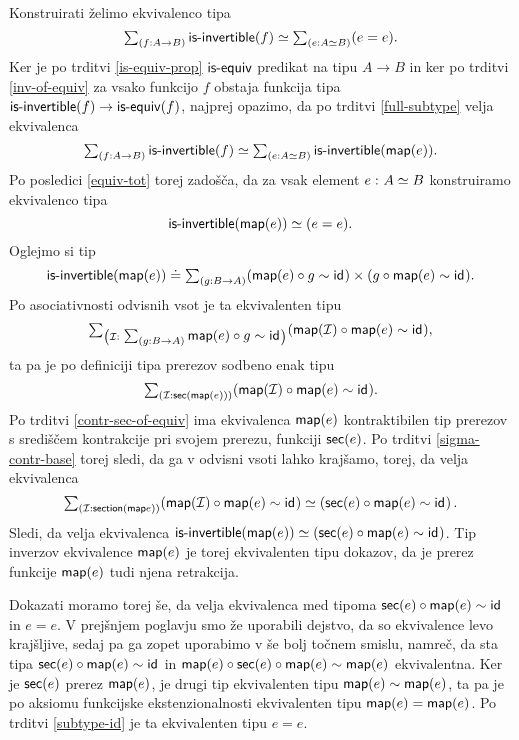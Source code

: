 \begin{dokaz}
  Konstruirati želimo ekvivalenco tipa
  \[\sumtype{f}{A \to B}{\isinv(f)} \simeq \sumtype{e}{A \simeq B}{(e = e)}.\]
  Ker je po trditvi \ref{is-equiv-prop} \(\isequiv\) predikat na tipu \(A \to B\) in ker po trditvi \ref{inv-of-equiv}
  za vsako funkcijo \(f\) obstaja funkcija tipa
  \(\typename{is-invertible}(f) \to \typename{is-equiv}(f)\), najprej opazimo, da po
  trditvi \ref{full-subtype} velja ekvivalenca
  \[\sumtype{f}{A \to B}{\isinv(f)} \simeq
    \sumtype{e}{A \simeq B}{\isinv(\map(e)).}
  \]
  Po posledici \ref{equiv-tot} torej zadošča, da za vsak element \(\dequiv{e}{A}{B}\) konstruiramo ekvivalenco tipa
  \[\isinv(\map(e)) \simeq (e = e).\]
  Oglejmo si tip
  \[\isinv(\map(e)) \doteq \sumtype{g}{B \to A}{(\map(e) \circ g \sim \id{}) \times (g \circ \map(e) \sim \id{})}.\]
  Po asociativnosti odvisnih vsot je ta ekvivalenten tipu
  \[\sumtype{\mathcal{I}}{\sumtype{g}{B \to A}{\map(e) \circ g \sim \id{}}}{(\map(\mathcal{I}) \circ \map(e) \sim \id{})},\]
  ta pa je po definiciji tipa prerezov sodbeno enak tipu
  \[\sumtype{\mathcal{I}}{\sect(\map(e))}{(\map(\mathcal{I}) \circ \map(e) \sim \id{})}.\]
  Po trditvi \ref{contr-sec-of-equiv} ima ekvivalenca \(\map(e)\) kontraktibilen tip prerezov s središčem kontrakcije pri svojem prerezu, funkciji \(\sect(e)\). Po trditvi \ref{sigma-contr-base} torej sledi, da ga v odvisni vsoti lahko krajšamo, torej, da velja ekvivalenca
  \[\sumtype{\mathcal{I}}{\typename{section}(\map e)}{(\map(\mathcal{I}) \circ \map(e) \sim \id{})} \simeq
    \left(\sect(e) \circ \map(e) \sim \id{}\right).\]
  Sledi, da velja ekvivalenca \(\isinv(\map (e)) \simeq (\sect(e) \circ \map(e) \sim \id{})\). Tip inverzov ekvivalence \(\map(e)\) je torej ekvivalenten tipu dokazov, da je prerez funkcije \(\map(e)\) tudi njena retrakcija.

  Dokazati moramo torej še, da velja ekvivalenca med tipoma \(\sect(e) \circ \map(e) \sim \id{}\) in \(e = e\). V prejšnjem poglavju smo že uporabili dejstvo, da so ekvivalence levo krajšljive, sedaj pa ga zopet uporabimo v še bolj točnem smislu, namreč, da sta tipa \(\sect(e) \circ \map(e) \sim \id{}\) in \(\map(e) \circ \sect(e) \circ \map(e) \sim \map(e)\) ekvivalentna. Ker je \(\sect(e)\) prerez \(\map(e)\), je drugi tip ekvivalenten tipu \(\map(e) \sim \map(e)\), ta pa je po aksiomu funkcijske ekstenzionalnosti ekvivalenten tipu \(\map(e) = \map(e)\). Po trditvi \ref{subtype-id} je ta ekvivalenten tipu \(e = e\).
\end{dokaz}


